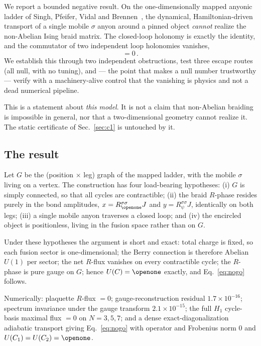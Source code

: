 \documentclass[aps,pra,twocolumn,superscriptaddress,longbibliography,floatfix,nofootinbib]{revtex4-2}
\newcommand{\Id}{\openone}
\begin{document}
We report a bounded negative result. On the one-dimensionally mapped anyonic
ladder of Singh, Pfeifer, Vidal and Brennen~\cite{Singh2014,Ayeni2016}, the
dynamical, Hamiltonian-driven transport of a single mobile $\sigma$ anyon
around a pinned object \emph{cannot} realize the non-Abelian Ising braid
matrix. The closed-loop holonomy is exactly the identity, and the commutator of
two independent loop holonomies vanishes,
\begin{equation}
  [U(C_1),\,U(C_2)] = 0\,.
  \label{eq:nogo}
\end{equation}
We establish this through two independent obstructions, test three escape
routes (all null, with no tuning), and --- the point that makes a null number
trustworthy --- verify with a machinery-alive control that the vanishing is
physics and not a dead numerical pipeline.

This is a statement about \emph{this model}. It is not a claim that non-Abelian
braiding is impossible in general, nor that a two-dimensional geometry cannot
realize it. The static certificate of Sec.~\ref{sec:c1} is untouched by it.

\subsection{The result}
\label{sec:nogoresult}

Let $G$ be the (position $\times$ leg) graph of the mapped ladder, with the
mobile $\sigma$ living on a vertex. The construction has four load-bearing
hypotheses: (i) $G$ is simply connected, so that all cycles are contractible;
(ii) the braid $R$-phase resides purely in the bond amplitudes,
$x=R^{\sigma\sigma}_{\Id}J$ and $y=R^{\sigma\sigma}_{\psi}J$, identically on
both legs; (iii) a single mobile anyon traverses a closed loop; and (iv) the
encircled object is positionless, living in the fusion space rather than on
$G$.

Under these hypotheses the argument is short and exact: total charge is fixed,
so each fusion sector is one-dimensional; the Berry connection is therefore
Abelian $U(1)$ per sector; the net $R$-flux vanishes on every contractible
cycle; the $R$-phase is pure gauge on $G$; hence $U(C)=\Id$ exactly, and
Eq.~\eqref{eq:nogo} follows.

Numerically: plaquette $R$-flux $=0$; gauge-reconstruction residual
$1.7\times10^{-16}$; spectrum invariance under the gauge transform
$2.1\times10^{-15}$; the full $H_1$ cycle-basis maximal flux $=0$ on
$N=3,5,7$; and a dense exact-diagonalization adiabatic transport giving
Eq.~\eqref{eq:nogo} with operator and Frobenius norm $0$ and
$U(C_1)=U(C_2)=\Id$.
\end{document}
